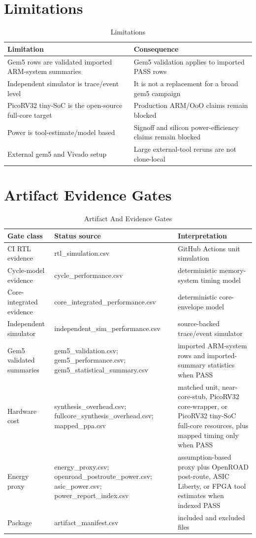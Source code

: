 \documentclass[10pt]{article}
\begin{document}
\section{Limitations}
\begin{table}[H]
\centering
\caption{Limitations}
\begin{tabularx}{\linewidth}{YY}
\hline
Limitation & Consequence \\
\hline
Gem5 rows are validated imported ARM-system summaries & Gem5 validation applies to imported PASS rows \\
Independent simulator is trace/event level & It is not a replacement for a broad gem5 campaign \\
PicoRV32 tiny-SoC is the open-source full-core target & Production ARM/OoO claims remain blocked \\
Power is tool-estimate/model based & Signoff and silicon power-efficiency claims remain blocked \\
External gem5 and Vivado setup & Large external-tool reruns are not clone-local \\
\hline
\end{tabularx}
\end{table}

\section{Artifact Evidence Gates}
\begin{table}[H]
\centering
\caption{Artifact And Evidence Gates}
\begin{tabularx}{\linewidth}{YYY}
\hline
Gate class & Status source & Interpretation \\
\hline
CI RTL evidence & rtl\_simulation.csv & GitHub Actions unit simulation \\
Cycle-model evidence & cycle\_performance.csv & deterministic memory-system timing model \\
Core-integrated evidence & core\_integrated\_performance.csv & deterministic core-envelope model \\
Independent simulator & independent\_sim\_performance.csv & source-backed trace/event simulator \\
Gem5 validated summaries & gem5\_validation.csv; gem5\_performance.csv; gem5\_statistical\_summary.csv & imported ARM-system rows and imported-summary statistics when PASS \\
Hardware cost & synthesis\_overhead.csv; fullcore\_synthesis\_overhead.csv; mapped\_ppa.csv & matched unit, near-core-stub, PicoRV32 core-wrapper, or PicoRV32 tiny-SoC full-core resources, plus mapped timing only when PASS \\
Energy proxy & energy\_proxy.csv; openroad\_postroute\_power.csv; asic\_power.csv; power\_report\_index.csv & assumption-based proxy plus OpenROAD post-route, ASIC Liberty, or FPGA tool estimates when indexed PASS \\
Package & artifact\_manifest.csv & included and excluded files \\
\hline
\end{tabularx}
\end{table}
\end{document}
